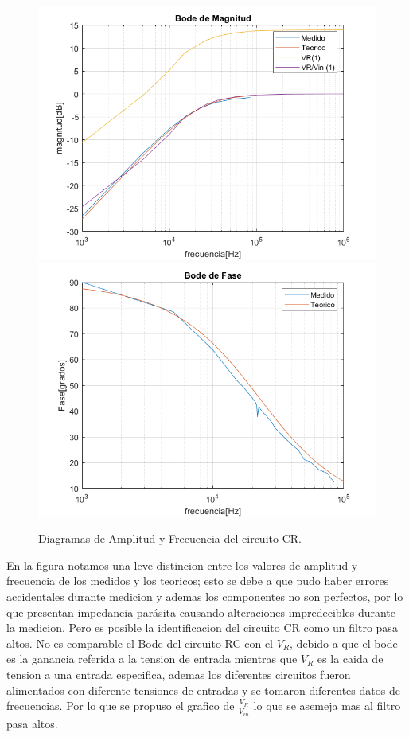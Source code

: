 \begin{figure}[h!]
\centering
\includegraphics[scale=0.5]{2Compmag.png}
\includegraphics[scale=0.5]{2Compfase.png}
\caption{Diagramas de Amplitud y Frecuencia del circuito CR.}
\label{fig:CR}
\end{figure}

En la figura notamos una leve distincion entre los valores de amplitud y frecuencia de los medidos y los teoricos; esto se debe a que pudo haber errores accidentales durante medicion y ademas los componentes no son perfectos, por lo que presentan impedancia parásita causando alteraciones impredecibles durante la medicion. Pero es posible la identificacion del circuito CR como un filtro pasa altos.
No es comparable el Bode del circuito RC con el $V_R$, debido a que el bode es la ganancia referida a la tension de entrada mientras que $V_R$ es la caida de tension a una entrada especifica, ademas los diferentes circuitos fueron alimentados con diferente tensiones de entradas y se tomaron diferentes datos de frecuencias. Por lo que se propuso el grafico de $\frac{V_R}{V_{in}}$ lo que se asemeja mas al filtro pasa altos.



